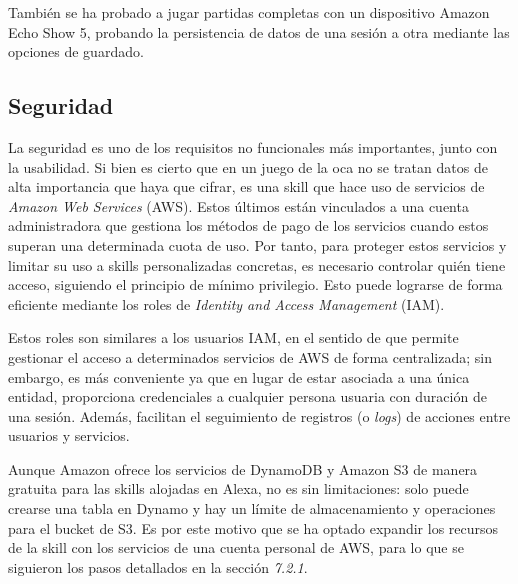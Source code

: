 También se ha probado a jugar partidas completas con un dispositivo Amazon Echo Show 5, probando la persistencia de datos de una sesión a otra mediante las opciones de guardado.

\newpage
\subsection{Seguridad}

La seguridad es uno de los requisitos no funcionales más importantes, junto con la usabilidad. Si bien es cierto que en un juego de la oca no se tratan datos de alta importancia que haya que cifrar, es una skill que hace uso de servicios de \textit{Amazon Web Services} (AWS). Estos últimos están vinculados a una cuenta administradora que gestiona los métodos de pago de los servicios cuando estos superan una determinada cuota de uso. Por tanto, para proteger estos servicios y limitar su uso a skills personalizadas concretas, es necesario controlar quién tiene acceso, siguiendo el principio de mínimo privilegio. Esto puede lograrse de forma eficiente mediante los roles de \textit{Identity and Access Management} (IAM).

Estos roles son similares a los usuarios IAM, en el sentido de que permite gestionar el acceso a determinados servicios de AWS de forma centralizada; sin embargo, es más conveniente ya que en lugar de estar asociada a una única entidad, proporciona credenciales a cualquier persona usuaria con duración de una sesión. Además, facilitan el seguimiento de registros (o \textit{logs}) de acciones entre usuarios y servicios.

Aunque Amazon ofrece los servicios de DynamoDB y Amazon S3 de manera gratuita para las skills alojadas en Alexa, no es sin limitaciones: solo puede crearse una tabla en Dynamo y hay un límite de almacenamiento y operaciones para el bucket de S3. Es por este motivo que se ha optado expandir los recursos de la skill con los servicios de una cuenta personal de AWS, para lo que se siguieron los pasos detallados en la sección \textit{7.2.1}.

